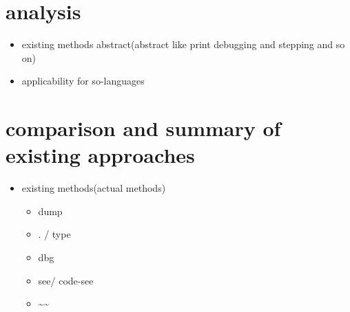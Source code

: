 \section{analysis}

\begin{itemize}
\item existing methods abstract(abstract like print debugging and stepping and so on)
\item applicability for so-languages
\end{itemize}

\section{comparison and summary of existing approaches}

\begin{itemize}
\item existing methods(actual methods)
\begin{itemize}
\item dump
\item . / type
\item dbg
\item see/ code-see
\item \textasciitilde\textasciitilde
\end{itemize}
\end{itemize}